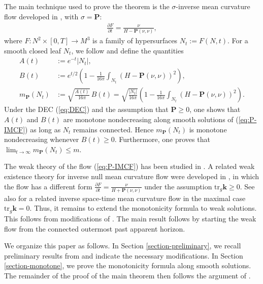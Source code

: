 \documentclass[11pt,letterpaper]{amsart}
\theoremstyle{definition}
\theoremstyle{remark}
\newcommand{\mP}{m_{\mathbf P}}
\newcommand{\Pten}{\mathbf P}
\newcommand{\kten}{\mathbf k}
\begin{document}
The main technique used to prove the theorem is the $\sigma $-inverse mean curvature flow developed in \cite{Dong26SigmaIMCF}, with $\sigma = \Pten$:
\begin{align}\label{eq:P-IMCF}
  \frac{\partial F}{\partial t}=\frac{\nu}{H - \Pten (\nu , \nu )},
\end{align}
where $F: N^2 \times [0, T] \to M^3$ is a family of hypersurfaces $N_t := F(N, t)$. 
 For a smooth closed leaf
 \(N_t\),  we follow \cite{Dong26SigmaIMCF} and define the quantities
\begin{align}\label{eq:mass-quantities}
  A(t)
  &:=e^{-t}|N_t|,
  \\
  B(t)
  &:=e^{t/2}\left(
     1-\frac{1}{16\pi}\int_{N_t}\left( H- \Pten (\nu ,\nu ) \right) ^2
  \right),
  \\
  \mP(N_t)
  &:=\sqrt{\frac{A(t)}{16\pi}}\,B(t)
   =\sqrt{\frac{|N_t|}{16\pi}}
     \left(1-\frac{1}{16\pi}
     \int_{N_t}\left( H - \Pten(\nu ,\nu ) \right) ^2 \right).
\end{align}
Under the DEC (\ref{eq:DEC}) and the assumption that $\Pten \geq 0$, one shows that $A(t)$ and $ B(t)$ are monotone nondecreasing along smooth solutions of (\ref{eq:P-IMCF}) as long as $N_t$ remains connected. Hence $\mP(N_t)$ is monotone nondecreasing whenever $B(t) \geq 0$. Furthermore, one proves that $\lim_{t\to \infty} m_{\Pten}(N_t) \leq m $.

The weak theory of the flow (\ref{eq:P-IMCF}) has been studied in \cite{Dong26SigmaIMCF}. A related weak existence theory for inverse null mean curvature flow were developed in \cite{Moore12}, in which the flow has a different form $\frac{\partial F}{\partial t} = \frac{\nu }{H+ \Pten(\nu ,\nu )}$ under the assumption $\mathrm{tr}_{g} \kten \geq 0$. See also \cite{HuiskenWolff22} for a related inverse space-time mean curvature flow in the maximal case $\mathrm{tr}_{g} \kten =0$. Thus, it remains to extend the monotonicity formula to weak solutions. This follows from modifications of \cite{Dong26SigmaIMCF}.  The main result follows by starting the weak flow from the connected outermost past apparent horizon.  

We organize this paper as follows. In Section \ref{section-preliminary}, we recall preliminary results from \cite{Dong26SigmaIMCF} and indicate the necessary modifications. In Section \ref{section-monotone}, we prove the monotonicity formula along smooth solutions. The remainder of the proof of the main theorem then follows the argument of \cite{Dong26SigmaIMCF}. 
\end{document}
